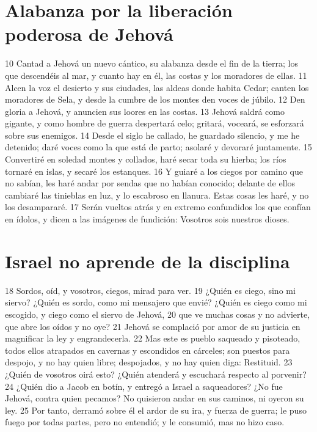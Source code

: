 \section*{Alabanza por la liberación poderosa de Jehová}

10 Cantad a Jehová un nuevo cántico, su alabanza desde el fin de la tierra; los que descendéis al mar, y cuanto hay en él, las costas y los moradores de ellas.
11 Alcen la voz el desierto y sus ciudades, las aldeas donde habita Cedar; canten los moradores de Sela, y desde la cumbre de los montes den voces de júbilo.
12 Den gloria a Jehová, y anuncien sus loores en las costas.
13 Jehová saldrá como gigante, y como hombre de guerra despertará celo; gritará, voceará, se esforzará sobre sus enemigos.
14 Desde el siglo he callado, he guardado silencio, y me he detenido; daré voces como la que está de parto; asolaré y devoraré juntamente.
15 Convertiré en soledad montes y collados, haré secar toda su hierba; los ríos tornaré en islas, y secaré los estanques.
16 Y guiaré a los ciegos por camino que no sabían, les haré andar por sendas que no habían conocido; delante de ellos cambiaré las tinieblas en luz, y lo escabroso en llanura. Estas cosas les haré, y no los desampararé.
17 Serán vueltos atrás y en extremo confundidos los que confían en ídolos, y dicen a las imágenes de fundición: Vosotros sois nuestros dioses.

\section*{Israel no aprende de la disciplina}

18 Sordos, oíd, y vosotros, ciegos, mirad para ver.
19 ¿Quién es ciego, sino mi siervo? ¿Quién es sordo, como mi mensajero que envié? ¿Quién es ciego como mi escogido, y ciego como el siervo de Jehová,
20 que ve muchas cosas y no advierte, que abre los oídos y no oye?
21 Jehová se complació por amor de su justicia en magnificar la ley y engrandecerla.
22 Mas este es pueblo saqueado y pisoteado, todos ellos atrapados en cavernas y escondidos en cárceles; son puestos para despojo, y no hay quien libre; despojados, y no hay quien diga: Restituid.
23 ¿Quién de vosotros oirá esto? ¿Quién atenderá y escuchará respecto al porvenir?
24 ¿Quién dio a Jacob en botín, y entregó a Israel a saqueadores? ¿No fue Jehová, contra quien pecamos? No quisieron andar en sus caminos, ni oyeron su ley.
25 Por tanto, derramó sobre él el ardor de su ira, y fuerza de guerra; le puso fuego por todas partes, pero no entendió; y le consumió, mas no hizo caso.

